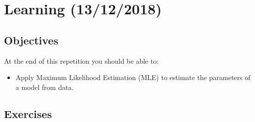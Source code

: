 \documentclass[a4paper, 10pt]{article}
\begin{document}


   \setcounter{page}{1}
   \section{Learning (13/12/2018)}
   
   \subsection{Objectives}
   At the end of this repetition you should be able to:
   \begin{itemize}
      \item Apply Maximum Likelihood Estimation (MLE) to estimate the parameters of a model from data.
   \end{itemize}
   \subsection{Exercises}
\end{document}
